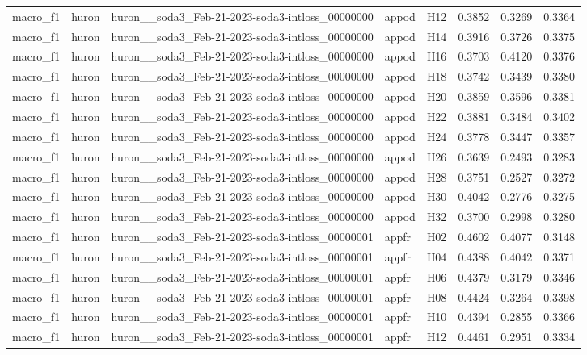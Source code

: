 \begin{table}[tbp]
\begin{tabular}{lllllrrr}
macro\_f1 & huron & huron\_\_soda3\_Feb-21-2023-soda3-intloss\_00000000 & appod & H12 & 0.3852 & 0.3269 & 0.3364 \\
macro\_f1 & huron & huron\_\_soda3\_Feb-21-2023-soda3-intloss\_00000000 & appod & H14 & 0.3916 & 0.3726 & 0.3375 \\
macro\_f1 & huron & huron\_\_soda3\_Feb-21-2023-soda3-intloss\_00000000 & appod & H16 & 0.3703 & 0.4120 & 0.3376 \\
macro\_f1 & huron & huron\_\_soda3\_Feb-21-2023-soda3-intloss\_00000000 & appod & H18 & 0.3742 & 0.3439 & 0.3380 \\
macro\_f1 & huron & huron\_\_soda3\_Feb-21-2023-soda3-intloss\_00000000 & appod & H20 & 0.3859 & 0.3596 & 0.3381 \\
macro\_f1 & huron & huron\_\_soda3\_Feb-21-2023-soda3-intloss\_00000000 & appod & H22 & 0.3881 & 0.3484 & 0.3402 \\
macro\_f1 & huron & huron\_\_soda3\_Feb-21-2023-soda3-intloss\_00000000 & appod & H24 & 0.3778 & 0.3447 & 0.3357 \\
macro\_f1 & huron & huron\_\_soda3\_Feb-21-2023-soda3-intloss\_00000000 & appod & H26 & 0.3639 & 0.2493 & 0.3283 \\
macro\_f1 & huron & huron\_\_soda3\_Feb-21-2023-soda3-intloss\_00000000 & appod & H28 & 0.3751 & 0.2527 & 0.3272 \\
macro\_f1 & huron & huron\_\_soda3\_Feb-21-2023-soda3-intloss\_00000000 & appod & H30 & 0.4042 & 0.2776 & 0.3275 \\
macro\_f1 & huron & huron\_\_soda3\_Feb-21-2023-soda3-intloss\_00000000 & appod & H32 & 0.3700 & 0.2998 & 0.3280 \\
macro\_f1 & huron & huron\_\_soda3\_Feb-21-2023-soda3-intloss\_00000001 & appfr & H02 & 0.4602 & 0.4077 & 0.3148 \\
macro\_f1 & huron & huron\_\_soda3\_Feb-21-2023-soda3-intloss\_00000001 & appfr & H04 & 0.4388 & 0.4042 & 0.3371 \\
macro\_f1 & huron & huron\_\_soda3\_Feb-21-2023-soda3-intloss\_00000001 & appfr & H06 & 0.4379 & 0.3179 & 0.3346 \\
macro\_f1 & huron & huron\_\_soda3\_Feb-21-2023-soda3-intloss\_00000001 & appfr & H08 & 0.4424 & 0.3264 & 0.3398 \\
macro\_f1 & huron & huron\_\_soda3\_Feb-21-2023-soda3-intloss\_00000001 & appfr & H10 & 0.4394 & 0.2855 & 0.3366 \\
macro\_f1 & huron & huron\_\_soda3\_Feb-21-2023-soda3-intloss\_00000001 & appfr & H12 & 0.4461 & 0.2951 & 0.3334 \\

\end{tabular}
\end{table}
